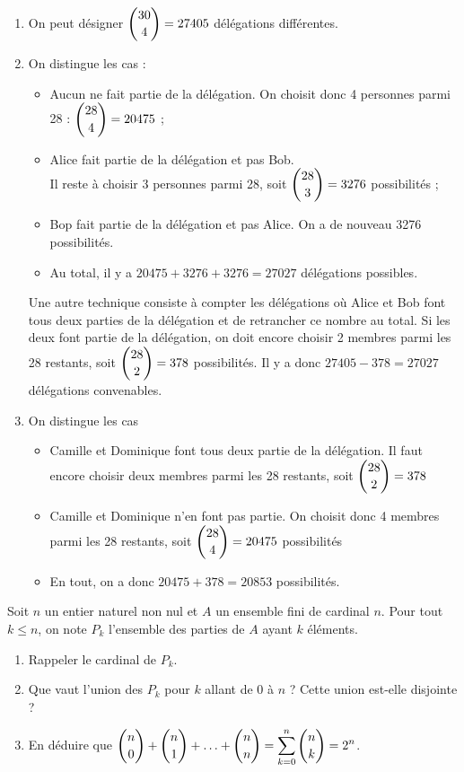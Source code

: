 \documentclass[11pt,fleqn, openany]{book} %
\begin{document}
\begin{solution}\hspace{0pt}
\vspace{-0.5cm}
\begin{enumerate}
\item On peut désigner $\dbinom{30}{4}=27405$ délégations différentes.

\item On distingue les cas :
\begin{itemize}
\item Aucun ne fait partie de la délégation. On choisit donc 4 personnes parmi 28 : $\dbinom{28}{4}=20475$ ;
\item Alice fait partie de la délégation et pas Bob. \\ Il reste à choisir 3 personnes parmi 28, soit $\dbinom{28}{3}=3276$ possibilités ;
\item Bop fait partie de la délégation et pas Alice. On a de nouveau 3276 possibilités.
\item Au total, il y a $20475+3276+3276=27027$ délégations possibles.
\end{itemize}
Une autre technique consiste à compter les délégations où Alice et Bob font tous deux parties de la délégation et de retrancher ce nombre au total. Si les deux font partie de la délégation, on doit encore choisir 2 membres parmi les 28 restants, soit $\dbinom{28}{2}=378$ possibilités. Il y a donc $27405-378=27027$ délégations convenables.

\item On distingue les cas
\begin{itemize}
\item Camille et Dominique font tous deux partie de la délégation. Il faut encore choisir deux membres parmi les 28 restants, soit $\dbinom{28}{2}=378$
\item Camille et Dominique n'en font pas partie. On choisit donc 4 membres parmi les 28 restants, soit $\dbinom{28}{4}=20475$ possibilités
\item En tout, on a donc $20475+378=20853$ possibilités.
\end{itemize}

\end{enumerate}
\newpage
\end{solution}




\begin{exercise}[topic=comb04]
Soit $n$ un entier naturel non nul et $A$ un ensemble fini de cardinal $n$. Pour tout $k\leqslant n$, on note $P_k$ l'ensemble des parties de $A$ ayant $k$ éléments.
\begin{enumerate}
\item Rappeler le cardinal de $P_k$.
\item Que vaut l'union des $P_k$ pour $k$ allant de 0 à $n$ ? Cette union est-elle disjointe ?
\item En déduire que $\dbinom{n}{0} + \dbinom{n}{1} + \ldots + \dbinom{n}{n} =\displaystyle\sum_{k=0}^{n} \dbinom{n}{k} = 2^n$.
\end{enumerate}\end{exercise}
\end{document}
